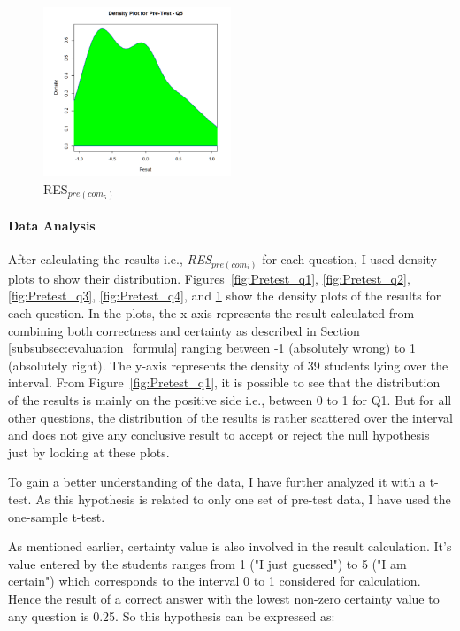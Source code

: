 \begin{figure}
	\centering
	\includegraphics[width=0.5\textwidth]{figures/Pretest_q5}
	\caption{RES$_{pre(com_5)}$}
	\label{fig:Pretest_q5}
\end{figure}

\paragraph{Data Analysis}
After calculating the results i.e., \textit{RES$_{pre(com_i)}$} for each question, I used density plots to show their distribution. Figures~\ref{fig:Pretest_q1}, \ref{fig:Pretest_q2}, \ref{fig:Pretest_q3}, \ref{fig:Pretest_q4}, and \ref{fig:Pretest_q5} show the density plots of the results for each question. In the plots, the x-axis represents the result calculated from combining both correctness and certainty as described in Section \ref{subsubsec:evaluation_formula} ranging between -1 (absolutely wrong) to 1 (absolutely right). The y-axis represents the density of 39 students lying over the interval. From Figure~\ref{fig:Pretest_q1}, it is possible to see that the distribution of the results is mainly on the positive side i.e., between 0 to 1 for Q1. But for all other questions, the distribution of the results is rather scattered over the interval and does not give any conclusive result to accept or reject the null hypothesis just by looking at these plots.

To gain a better understanding of the data, I have further analyzed it with a t-test. As this hypothesis is related to only one set of pre-test data, I have used the one-sample t-test.   

As mentioned earlier, certainty value is also involved in the result calculation. It's value entered by the students ranges from 1 ("I just guessed") to 5 ("I am certain") which corresponds to the interval 0 to 1 considered for calculation. Hence the result of a correct answer with the lowest non-zero certainty value to any question is 0.25. So this hypothesis can be expressed as:   

